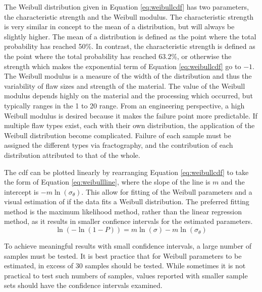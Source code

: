     The Weibull distribution given in Equation \ref{eq:weibullcdf} has two parameters, the characteristic strength and the Weibull modulus.
    The characteristic strength is very similar in concept to the mean of a distribution, but will always be slightly higher.
    The mean of a distribution is defined as the point where the total probability has reached 50\%.
    In contrast, the characteristic strength is defined as the point where the total probability has reached 63.2\%, or otherwise the strength which makes the exponential term of Equation \ref{eq:weibullcdf} go to $-1$.
    The Weibull modulus is a measure of the width of the distribution and thus the variability of flaw sizes and strength of the material.
    The value of the Weibull modulus depends highly on the material and the processing which occurred, but typically ranges in the 1 to 20 range.
    From an engineering perspective, a high Weibull modulus is desired because it makes the failure point more predictable.
    If multiple flaw types exist, each with their own distribution, the application of the Weibull distribution become complicated.
    Failure of each sample must be assigned the different types via fractography, and the contribution of each distribution attributed to that of the whole.

    The \gls{cdf} can be plotted linearly by rearranging Equation \ref{eq:weibullcdf} to take the form of Equation \ref{eq:weibullline}, where the slope of the line is $m$ and the intercept is $-m\ln(\sigma_\theta)$.
    This allow for fitting of the Weibull parameters and a visual estimation of if the data fits a Weibull distribution.
    The preferred fitting method is the maximum likelihood method, rather than the linear regression method, as it results in smaller confience intervals for the estimated parameters.
    \begin{equation}
        \label{eq:weibullline}
        \ln(-\ln(1-P))=m \ln(\sigma) - m\ln(\sigma_\theta)
    \end{equation}

    To achieve meaningful results with small confidence intervals, a large number of samples must be tested.
    It is best practice that for Weibull parameters to be estimated, in excess of 30 samples should be tested.
    While sometimes it is not practical to test such numbers of samples, values reported with smaller sample sets should have the confidence intervals examined.

